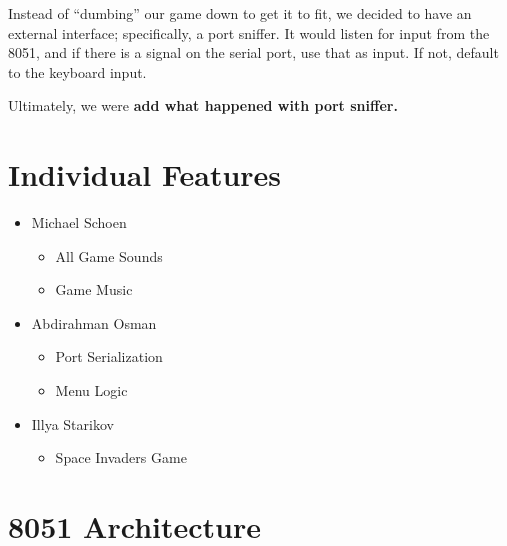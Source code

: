 \documentclass[12pt]{article}
\newcommand{\todo}[1]{\textbf{\colorbox{red!50}{#1}}}
\begin{document}
Instead of ``dumbing'' our game down to get it to fit, we decided to have an external interface; specifically, a port sniffer. It would listen for input from the \num{8051}, and if there is a signal on the serial port, use that as input. If not, default to the keyboard input.

Ultimately, we were \todo{add what happened with port sniffer.}


\section{Individual Features}
\begin{itemize}
    \item Michael Schoen
    \begin{itemize}
        \item All Game Sounds
        \item Game Music
    \end{itemize}

    \item Abdirahman Osman
    \begin{itemize}
        \item Port Serialization
        \item Menu Logic
    \end{itemize}

    \item Illya Starikov
    \begin{itemize}
        \item Space Invaders Game
    \end{itemize}
\end{itemize}

\section{8051 Architecture}
\end{document}
